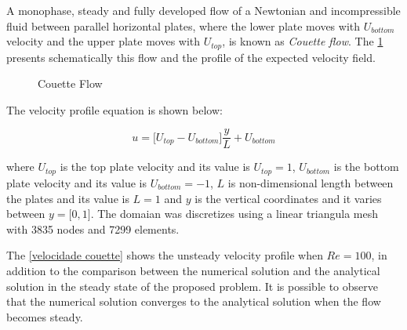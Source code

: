 A monophase, steady and fully developed flow of a 
Newtonian and incompressible fluid between parallel horizontal 
plates, where the lower plate moves with \textit{$U_{bottom}$} 
velocity and the upper plate moves with \textit{$ U_{top}$}, 
is known as \textit{Couette flow}. The \ref{couette}
 presents schematically this flow and the profile of the expected velocity field.

\begin{figure}[H]
\begin{center}
\end{center}
\caption{Couette Flow}
\label{couette}
\end{figure}


\noindent
The velocity profile equation is shown below:

\begin{equation}
 u = \big[ U_{top} - U_{bottom} \big] \frac{y}{L} + U_{bottom}
\end{equation}

\medskip
\noindent
where $U_{top}$ is the top plate velocity and its value is
$U_{top} = 1$, 
$U_{bottom}$ is the bottom plate velocity and its value is
$U_{bottom} = -1$, 
$L$ is non-dimensional length
between the plates and its value is $L = 1$
and $y$ is the vertical coordinates and it varies between 
$y = \big[ 0,1 \big]$.
The domaian was discretizes using a linear triangula mesh with 
3835 nodes and 7299 elements. 

\bigskip
The \ref{velocidade couette} shows the unsteady velocity profile
when $Re=100$, in addition to the comparison between 
the numerical solution and the analytical solution 
in the steady state of the proposed problem. 
It is possible to observe that the numerical solution 
converges to the analytical solution when the flow becomes steady.

